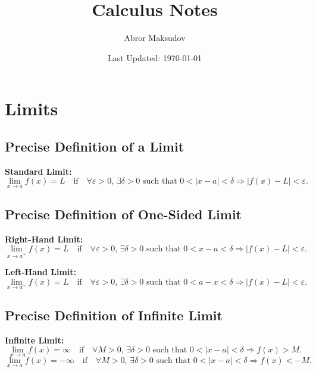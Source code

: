 \documentclass[a4paper,11pt]{article}
\title{Calculus Notes}
\author{Abror Maksudov}
\date{Last Updated: \today}
\begin{document}
\maketitle
\tableofcontents

\section{Limits}




\subsection{Precise Definition of a Limit}

\begin{tcolorbox}
    \textbf{Standard Limit:}  
    \[
    \lim_{x \to a} f(x) = L \quad \text{if} \quad \forall \varepsilon > 0, \, \exists \delta > 0 \text{ such that } 0 < |x - a| < \delta \Rightarrow |f(x) - L| < \varepsilon.
    \]
\end{tcolorbox}



\subsection{Precise Definition of One-Sided Limit}

\begin{tcolorbox}
\textbf{Right-Hand Limit:}  
\[
\lim_{x \to a^+} f(x) = L \quad \text{if} \quad \forall \varepsilon > 0, \, \exists \delta > 0 \text{ such that } 0 < x - a < \delta \Rightarrow |f(x) - L| < \varepsilon.
\]

\textbf{Left-Hand Limit:}  
\[
\lim_{x \to a^-} f(x) = L \quad \text{if} \quad \forall \varepsilon > 0, \, \exists \delta > 0 \text{ such that } 0 < a - x < \delta \Rightarrow |f(x) - L| < \varepsilon.
\]
\end{tcolorbox}




\subsection{Precise Definition of Infinite Limit}

\begin{tcolorbox}
\textbf{Infinite Limit:}  
\[
\lim_{x \to a} f(x) = \infty \quad \text{if} \quad \forall M > 0, \, \exists \delta > 0 \text{ such that } 0 < |x - a| < \delta \Rightarrow f(x) > M.
\]
\[
\lim_{x \to a} f(x) = -\infty \quad \text{if} \quad \forall M > 0, \, \exists \delta > 0 \text{ such that } 0 < |x - a| < \delta \Rightarrow f(x) < -M.
\]
\end{tcolorbox}
\end{document}

